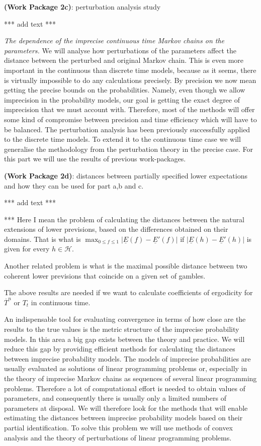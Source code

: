 \documentclass[11pt,dvipsnames,usenames,a4paper]{article}
\begin{document}
{\bf (Work Package 2c)}: perturbation analysis study

*** add text ***

\emph{The dependence of the imprecise continuous time Markov chains on the parameters.} We will analyse how perturbations of the parameters affect the distance between the perturbed and original Markov chain. This is even more important in the continuous than discrete time models, because as it seems, there is virtually impossible to do any calculations precisely. By precision we now mean getting the precise bounds on the probabilities. Namely, even though we allow imprecision in the probability models, our goal is getting the exact degree of imprecision that we must account with. Therefore, most of the methods will offer some kind of compromise between precision and time efficiency which will have to be balanced. The perturbation analysis has been previously successfully applied to the discrete time models. To extend it to the continuous time case we will generalise the methodology from the perturbation theory in the precise case. For this part we will use the results of previous work-packages. 

{\bf (Work Package 2d)}: distances between partially specified lower expectations and how they can be used for part a,b and c.

*** add text ***

*** Here I mean the problem of calculating the distances between the natural extensions of lower previsions, based on the differences obtained on their domains. That is what is $\max_{0\le f \le 1} |\underline E(f)-\underline E'(f)|$ if $ |\underline E(h)-\underline E'(h)|$ is given for every $h \in \mathcal H$. 
 
 Another related problem is what is the maximal possible distance between two coherent lower previsions that coincide on a given set of gambles. 
 
 The above results are needed if we want to calculate coefficients of ergodicity for $\overline T^n$ or $T_t$ in continuous time. 

 An indispensable tool for evaluating convergence in terms of how close are the results to the true values is the metric structure of the imprecise probability models. In this area a big gap exists between the theory and practice. We will reduce this gap by providing efficient methods for calculating the distances between imprecise probability models. The models of imprecise probabilities are usually evaluated as solutions of linear programming problems or, especially in the theory of imprecise Markov chains as sequences of several linear programming problems. Therefore a lot of computational effort is needed to obtain values of parameters, and consequently there is usually only a limited numbers of parameters at disposal. We will therefore look for the methods that will enable estimating the distances between imprecise probability models based on their partial identification. To solve this problem we will use methods of convex analysis and the theory of perturbations of linear programming problems. 
\end{document}
